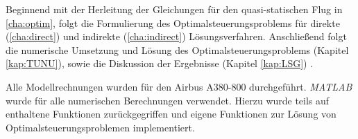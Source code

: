 Beginnend mit der Herleitung der Gleichungen für den quasi-statischen Flug in \autoref{cha:optim}, folgt die Formulierung des Optimalsteuerungsproblems für direkte (\autoref{cha:direct}) und indirekte (\autoref{cha:indirect}) Lösungsverfahren. Anschließend folgt die numerische Umsetzung und Lösung des Optimalsteuerungsproblems (Kapitel \ref{kap:TUNU}), sowie die Diskussion der Ergebnisse (Kapitel \ref{kap:LSG}) .

Alle Modellrechnungen wurden für den Airbus A380-800 \cite{A380Tech} durchgeführt. \textit{MATLAB} wurde für alle numerischen Berechnungen verwendet. Hierzu wurde teils auf enthaltene Funktionen zurückgegriffen und eigene Funktionen zur Lösung von Optimalsteuerungsproblemen implementiert.




